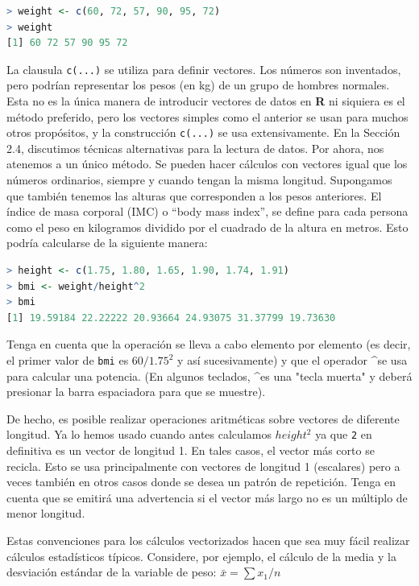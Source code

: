 \documentclass[spanish]{extbook}
\numberwithin{equation}{section}
\numberwithin{figure}{section}
\begin{document}
\begin{lstlisting}[language=R]
> weight <- c(60, 72, 57, 90, 95, 72) 
> weight 
[1] 60 72 57 90 95 72
\end{lstlisting}

La clausula \texttt{c(...)} se utiliza para definir vectores. Los números son
inventados, pero podrían representar los pesos (en kg) de un grupo de hombres
normales. Esta no es la única manera de introducir vectores de datos en
\textbf{R} ni siquiera es el método preferido, pero los vectores simples como
el anterior se usan para muchos otros propósitos, y la construcción
\texttt{c(...)} se usa extensivamente. En la Sección 2.4, discutimos técnicas
alternativas para la lectura de datos. Por ahora, nos atenemos a un único
método. Se pueden hacer cálculos con vectores igual que los números ordinarios,
siempre y cuando tengan la misma longitud.  Supongamos que también tenemos las
alturas que corresponden a los pesos anteriores. El índice de masa corporal
(IMC) o ``body mass index'', se define para cada persona como el peso en
kilogramos dividido por el cuadrado de la altura en metros. Esto podría
calcularse de la siguiente manera:

\begin{lstlisting}[language=R]
> height <- c(1.75, 1.80, 1.65, 1.90, 1.74, 1.91) 
> bmi <- weight/height^2 
> bmi 
[1] 19.59184 22.22222 20.93664 24.93075 31.37799 19.73630
\end{lstlisting}

Tenga en cuenta que la operación se lleva a cabo elemento por elemento (es
decir, el primer valor de \texttt{bmi} es $60/1.75^2$ y así sucesivamente) y
que el operador \textasciicircum se usa para calcular una potencia. (En algunos
teclados, \textasciicircum es una "tecla muerta" y deberá presionar la barra
espaciadora para que se muestre).

De hecho, es posible realizar operaciones aritméticas sobre vectores de
diferente longitud. Ya lo hemos usado cuando antes calculamos $height^2$
ya que \texttt{2} en definitiva es un vector de longitud 1. En tales casos, el
vector más corto se recicla. Esto se usa principalmente con vectores de
longitud 1 (escalares) pero a veces también en otros casos donde se desea un
patrón de repetición. Tenga en cuenta que se emitirá una advertencia si el
vector más largo no es un múltiplo de menor longitud.

Estas convenciones para los cálculos vectorizados hacen que sea muy fácil
realizar cálculos estadísticos típicos. Considere, por ejemplo, el cálculo
de la media y la desviación estándar de la variable de peso: $\bar{x} = \sum x_1/n$
\end{document}
